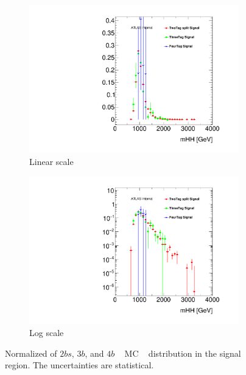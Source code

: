 \begin{figure}[htbp!]
  \centering
  \captionsetup{justification=centering}
  \hspace{-0.5cm}
    \begin{subfigure}[b]{0.45\textwidth}
        \includegraphics[width=\textwidth,angle=-90]{figures/boosted/Other/ttbar_compare_mHH_l.pdf}
        \caption{Linear scale}
        \label{fig:ttshapeComp_lin}
    \end{subfigure}
    \quad
    \begin{subfigure}[b]{0.45\textwidth}
        \includegraphics[width=\textwidth,angle=-90]{figures/boosted/Other/ttbar_compare_mHH_l_1.pdf}
        \caption{Log scale}
        \label{fig:ttshapeComp_log}
    \end{subfigure}
   \caption{Normalized of $2bs$, $3b$, and $4b$ \ttbar~ MC \mtwoJ~ distribution in the signal region. The uncertainties are statistical.}
  \label{fig:ttshapeComp}
\end{figure}



